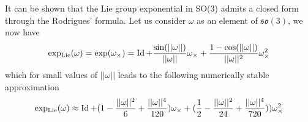 It can be shown that the Lie group exponential in SO(3) admits a closed form through the Rodrigues’ formula. Let us consider $\omega$ as an element of $\mathfrak{so}(3)$, we now have
\begin{equation}
\operatorname{exp_{Lie}}(\omega) = \exp(\omega_\times) = \operatorname{Id} + \frac{\sin(||\omega||)}{||\omega||}\omega_\times + \frac{1-\cos(||\omega||)}{||\omega||^2}\omega_\times^2
\end{equation}
which for small values of $||\omega||$ leads to the following numerically stable approximation
\begin{equation}
\operatorname{exp_{Lie}}(\omega) \approx \operatorname{Id}
+ (1-\frac{||\omega||^2}{6}+\frac{||\omega||^4}{120})\omega_\times
+ (\frac{1}{2}-\frac{||\omega||^2}{24}+\frac{||\omega||^4}{720}))\omega_\times^2
\end{equation}

\iffalse
For compatibility with the 3D cross product, we choose the following basis for the matrix representation of $\mathfrak{se}(3)$:
\begin{align}
e_1 &= 
\begin{bmatrix}
0 & 0 & 0  & 0 \\
0 & 0 & -1 & 0 \\
0 & 1 & 0  & 0 \\
0 & 0 & 0  & 0
\end{bmatrix}
\\
e_2 &=
\begin{bmatrix}
0  & 0 & 1 & 0 \\
0  & 0 & 0 & 0 \\
-1 & 0 & 0 & 0 \\
0  & 0 & 0 & 0
\end{bmatrix}
\\
e_3 &=
\begin{bmatrix}
0 & -1 & 0 & 0 \\
1 & 0  & 0 & 0 \\
0 & 0  & 0 & 0 \\
0 & 0  & 0 & 0
\end{bmatrix}
\\
e_4 &=
\begin{bmatrix}
0 & 0 & 0 & 1 \\
0 & 0 & 0 & 0 \\
0 & 0 & 0 & 0 \\
0 & 0 & 0 & 0
\end{bmatrix}
\\
e_5 &=
\begin{bmatrix}
0 & 0 & 0 & 0 \\
0 & 0 & 0 & 1 \\
0 & 0 & 0 & 0 \\
0 & 0 & 0 & 0
\end{bmatrix}
\\
e_6 &=
\begin{bmatrix}
0 & 0 & 0 & 0 \\
0 & 0 & 0 & 0 \\
0 & 0 & 0 & 1 \\
0 & 0 & 0 & 0
\end{bmatrix}
\end{align}
\fi

